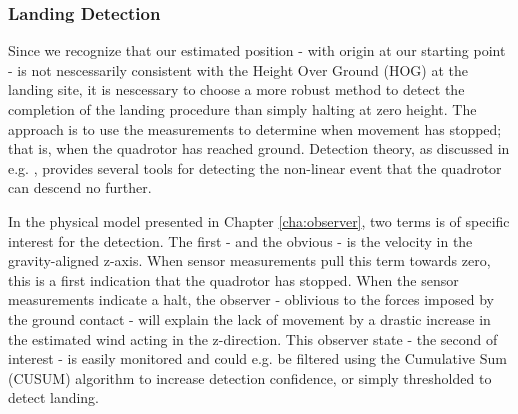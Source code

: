             \subsubsection{Landing Detection}
                Since we recognize that our estimated position - with origin at our starting point -
                is not nescessarily consistent with the Height Over Ground (HOG)
                at the landing site, it is nescessary to choose a more robust
                method to detect the completion of the landing procedure than simply halting at zero height.
                The approach is to use the measurements to determine when movement
                has stopped; that is, when the quadrotor has reached ground.
                Detection theory, as discussed in e.g. \citep{Tornqvist08,nyberg11diagnosis},
                provides several tools for detecting the non-linear event that
                the quadrotor can descend no further.

                In the physical model presented in Chapter \ref{cha:observer},
                two terms is of specific interest for the detection.
                The first - and the obvious - is the velocity in the gravity-aligned z-axis.
                When sensor measurements pull this term towards zero,
                this is a first indication that the quadrotor has stopped.
                When the sensor measurements indicate a halt, the
                observer - oblivious to the forces imposed by the
                ground contact - will explain the lack of movement by a drastic increase in
                the estimated wind acting in the z-direction.
                This observer state - the second of interest - is easily monitored
                and could e.g. be filtered using the Cumulative Sum (CUSUM) algorithm to
                increase detection confidence, or simply thresholded to detect landing.

